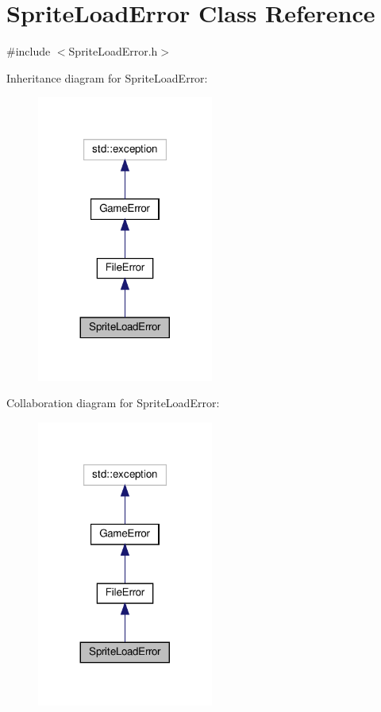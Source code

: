 \hypertarget{classSpriteLoadError}{}\section{Sprite\+Load\+Error Class Reference}
\label{classSpriteLoadError}


{\ttfamily \#include $<$Sprite\+Load\+Error.\+h$>$}



Inheritance diagram for Sprite\+Load\+Error\+:\nopagebreak
\begin{figure}[H]
\begin{center}
\leavevmode
\includegraphics[width=164pt]{classSpriteLoadError__inherit__graph}
\end{center}
\end{figure}


Collaboration diagram for Sprite\+Load\+Error\+:\nopagebreak
\begin{figure}[H]
\begin{center}
\leavevmode
\includegraphics[width=164pt]{classSpriteLoadError__coll__graph}
\end{center}
\end{figure}
